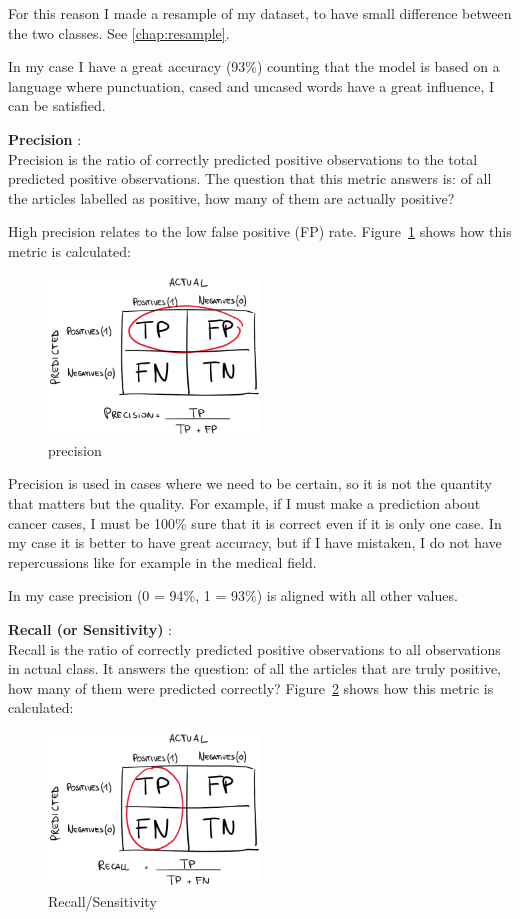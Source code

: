 For this reason I made a resample of my dataset, to have small difference between the two classes. See \ref{chap:resample}.

In my case I have a great \gls{accuracy} (93\%) counting that the model is based on a language where punctuation, cased and uncased words have a great influence, I can be satisfied.


\textbf{Precision} \cite{brownlee_how_2020}:\\
Precision is the ratio of correctly predicted positive observations to the total predicted positive observations. 
The question that this metric answers is: 
of all the articles labelled as positive, how many of them are actually positive?

High \gls{precision} relates to the low false positive (FP) rate. 
Figure~\ref{fig:fig_pre} shows how this metric is calculated:
\begin{figure}[ht!]
\centering
\includegraphics[width=0.5\textwidth]{images/prec.png}
\caption{\gls{precision}}
\label{fig:fig_pre}
\end{figure}
\FloatBarrier

Precision is used in cases where we need to be certain, so it is not the quantity that matters but the quality. For example, if I must make a prediction about cancer cases, I must be 100\% sure that it is correct even if it is only one case.
In my case it is better to have great \gls{accuracy}, but if I have mistaken, I do not have repercussions like for example in the medical field.

In my case \gls{precision} (0 = 94\%, 1 = 93\%) is aligned with all other values.

\textbf{Recall (or Sensitivity)} \cite{brownlee_how_2020}:\\
Recall is the ratio of correctly predicted positive observations to all observations in actual class. It answers the question:
of all the articles that are truly positive, how many of them were predicted correctly? 
Figure~\ref{fig:fig_rec} shows how this metric is calculated:
\begin{figure}[ht!]
\centering
\includegraphics[width=0.5\textwidth]{images/rec.png}
\caption{Recall/Sensitivity}
\label{fig:fig_rec}
\end{figure}
\FloatBarrier

